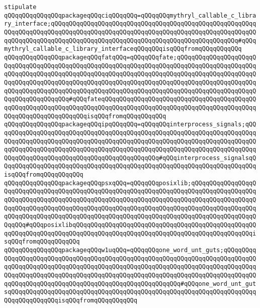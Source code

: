 \newline
\verb|stipulate|\newline
\verb|qQQqqQQqqQQqqQQqpackageqQQqciqQQqqQQq=qQQqqQQqmythryl_callable_c_library_interface;qQQqqQQqqQQqqQQqqQQqqQQqqQQqqQQqqQQqqQQqqQQqqQQqqQQqqQQqqQQqqQQqqQQqqQQqqQQqqQQqqQQqqQQqqQQqqQQqqQQqqQQqqQQqqQQqqQQqqQQqqQQqqQQqqQQqqQQqqQQqqQQqqQQqqQQqqQQqqQQqqQQqqQQqqQQqqQQqqQQqqQQqqQQqqQQq#qQQqmythryl_callable_c_library_interfaceqQQqqQQqisqQQqfromqQQqqQQqqQQq|\newline
\verb|qQQqqQQqqQQqqQQqpackageqQQqfatqQQq=qQQqqQQqfate;qQQqqQQqqQQqqQQqqQQqqQQqqQQqqQQqqQQqqQQqqQQqqQQqqQQqqQQqqQQqqQQqqQQqqQQqqQQqqQQqqQQqqQQqqQQqqQQqqQQqqQQqqQQqqQQqqQQqqQQqqQQqqQQqqQQqqQQqqQQqqQQqqQQqqQQqqQQqqQQqqQQqqQQqqQQqqQQqqQQqqQQqqQQqqQQqqQQqqQQqqQQqqQQqqQQqqQQqqQQqqQQqqQQqqQQqqQQqqQQqqQQqqQQqqQQqqQQqqQQqqQQqqQQqqQQqqQQqqQQqqQQqqQQqqQQqqQQqqQQqqQQqqQQqqQQqqQQqqQQq#qQQqfateqQQqqQQqqQQqqQQqqQQqqQQqqQQqqQQqqQQqqQQqqQQqqQQqqQQqqQQqqQQqqQQqqQQqqQQqqQQqqQQqqQQqqQQqqQQqqQQqqQQqqQQqqQQqqQQqqQQqqQQqqQQqqQQqqQQqqQQqisqQQqfromqQQqqQQqqQQq|\newline
\verb|qQQqqQQqqQQqqQQqpackageqQQqipqQQqqQQq=qQQqqQQqinterprocess_signals;qQQqqQQqqQQqqQQqqQQqqQQqqQQqqQQqqQQqqQQqqQQqqQQqqQQqqQQqqQQqqQQqqQQqqQQqqQQqqQQqqQQqqQQqqQQqqQQqqQQqqQQqqQQqqQQqqQQqqQQqqQQqqQQqqQQqqQQqqQQqqQQqqQQqqQQqqQQqqQQqqQQqqQQqqQQqqQQqqQQqqQQqqQQqqQQqqQQqqQQqqQQqqQQqqQQqqQQqqQQqqQQqqQQqqQQqqQQqqQQqqQQqqQQqqQQqqQQq#qQQqinterprocess_signalsqQQqqQQqqQQqqQQqqQQqqQQqqQQqqQQqqQQqqQQqqQQqqQQqqQQqqQQqqQQqqQQqqQQqqQQqisqQQqfromqQQqqQQqqQQq|\newline
\verb|qQQqqQQqqQQqqQQqpackageqQQqpsxqQQq=qQQqqQQqposixlib;qQQqqQQqqQQqqQQqqQQqqQQqqQQqqQQqqQQqqQQqqQQqqQQqqQQqqQQqqQQqqQQqqQQqqQQqqQQqqQQqqQQqqQQqqQQqqQQqqQQqqQQqqQQqqQQqqQQqqQQqqQQqqQQqqQQqqQQqqQQqqQQqqQQqqQQqqQQqqQQqqQQqqQQqqQQqqQQqqQQqqQQqqQQqqQQqqQQqqQQqqQQqqQQqqQQqqQQqqQQqqQQqqQQqqQQqqQQqqQQqqQQqqQQqqQQqqQQqqQQqqQQqqQQqqQQqqQQqqQQqqQQqqQQqqQQqqQQqqQQqqQQq#qQQqposixlibqQQqqQQqqQQqqQQqqQQqqQQqqQQqqQQqqQQqqQQqqQQqqQQqqQQqqQQqqQQqqQQqqQQqqQQqqQQqqQQqqQQqqQQqqQQqqQQqqQQqqQQqqQQqqQQqqQQqqQQqisqQQqfromqQQqqQQqqQQq|\newline
\verb|qQQqqQQqqQQqqQQqpackageqQQqw1uqQQq=qQQqqQQqone_word_unt_guts;qQQqqQQqqQQqqQQqqQQqqQQqqQQqqQQqqQQqqQQqqQQqqQQqqQQqqQQqqQQqqQQqqQQqqQQqqQQqqQQqqQQqqQQqqQQqqQQqqQQqqQQqqQQqqQQqqQQqqQQqqQQqqQQqqQQqqQQqqQQqqQQqqQQqqQQqqQQqqQQqqQQqqQQqqQQqqQQqqQQqqQQqqQQqqQQqqQQqqQQqqQQqqQQqqQQqqQQqqQQqqQQqqQQqqQQqqQQqqQQqqQQqqQQqqQQqqQQqqQQqqQQqqQQq#qQQqone_word_unt_gutsqQQqqQQqqQQqqQQqqQQqqQQqqQQqqQQqqQQqqQQqqQQqqQQqqQQqqQQqqQQqqQQqqQQqqQQqqQQqqQQqqQQqisqQQqfromqQQqqQQqqQQq|\newline
